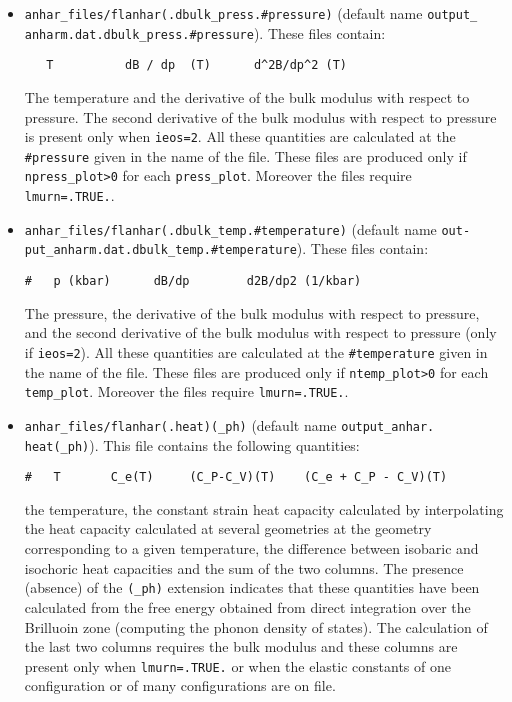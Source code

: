 \documentclass[12pt,a4paper,twoside]{report}
\begin{document}
\begin{itemize}
\item \texttt{anhar\_files/flanhar(.dbulk\_press.\#pressure)} 
(default name \texttt{output\_}\\ \texttt{anharm.dat.dbulk\_press.\#pressure}).
These files contain:
\begin{verbatim}
   T          dB / dp  (T)      d^2B/dp^2 (T) 
\end{verbatim}
The temperature and the derivative of the bulk modulus with respect 
to pressure. The second derivative of the bulk modulus with respect
to pressure is present only when \texttt{ieos=2}.
All these quantities are calculated at the \texttt{\#pressure} given
in the name of the file.
These files are produced only if \texttt{npress\_plot>0} for each
\texttt{press\_plot}. Moreover the files require \texttt{lmurn=.TRUE.}.

\item \texttt{anhar\_files/flanhar(.dbulk\_temp.\#temperature)}
(default name \texttt{out-} \texttt{put\_anharm.dat.dbulk\_temp.\#temperature}).
These files contain:
\begin{verbatim}
#   p (kbar)      dB/dp        d2B/dp2 (1/kbar)
\end{verbatim}
The pressure, the derivative of the bulk modulus with respect to pressure,
and the second derivative of the bulk modulus with respect to pressure
(only if \texttt{ieos=2}).
All these quantities are calculated at the \texttt{\#temperature} given
in the name of the file.
These files are produced only if \texttt{ntemp\_plot>0} for each
\texttt{temp\_plot}. Moreover the files require \texttt{lmurn=.TRUE.}.

\item 
\texttt{anhar\_files/flanhar(.heat)(\_ph)}
(default name \texttt{output\_anhar.}\\ \texttt{heat(\_ph)}). 
This file contains the following quantities:
\begin{verbatim}
#   T       C_e(T)     (C_P-C_V)(T)    (C_e + C_P - C_V)(T)    
\end{verbatim}
the temperature, the constant strain heat capacity calculated 
by interpolating the heat capacity calculated at several geometries 
at the geometry corresponding to a given temperature, the
difference between isobaric and isochoric heat capacities and the
sum of the two columns. 
The presence (absence) of the \texttt{(\_ph)} extension indicates that
these quantities have been calculated from the free energy obtained from 
direct integration over the Brilluoin zone (computing the phonon density
of states). 
The calculation of the last two columns requires the bulk modulus
and these columns are present only when \texttt{lmurn=.TRUE.} or 
when the elastic constants of one configuration or of many configurations
are on file. 


\end{itemize}
\end{document}
